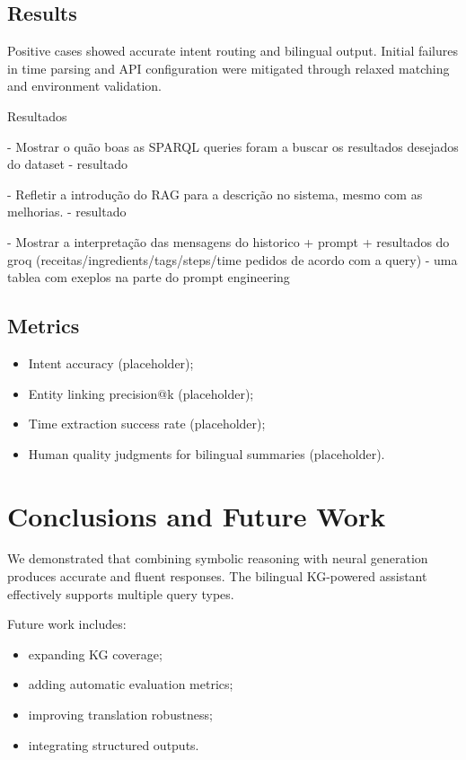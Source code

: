 \documentclass[conference]{IEEEtran}
\begin{document}
\subsection{Results}
Positive cases showed accurate intent routing and bilingual output. Initial failures in time parsing and API configuration were mitigated through relaxed matching and environment validation.

Resultados

- Mostrar o quão boas as SPARQL queries foram a buscar os resultados desejados do dataset - resultado

- Refletir a introdução do RAG para a descrição no sistema, mesmo com as melhorias. - resultado

- Mostrar a interpretação das mensagens do historico + prompt + resultados do groq (receitas/ingredients/tags/steps/time pedidos de acordo com a query) - uma tablea com exeplos na parte do prompt engineering



\subsection{Metrics}
\begin{itemize}
  \item Intent accuracy (placeholder);
  \item Entity linking precision@k (placeholder);
  \item Time extraction success rate (placeholder);
  \item Human quality judgments for bilingual summaries (placeholder).
\end{itemize}

\section{Conclusions and Future Work}

We demonstrated that combining symbolic reasoning with neural generation produces accurate and fluent responses. The bilingual KG-powered assistant effectively supports multiple query types.

Future work includes:
\begin{itemize}
  \item expanding KG coverage;
  \item adding automatic evaluation metrics;
  \item improving translation robustness;
  \item integrating structured outputs.
\end{itemize}


\footnotesize 

\end{document}
